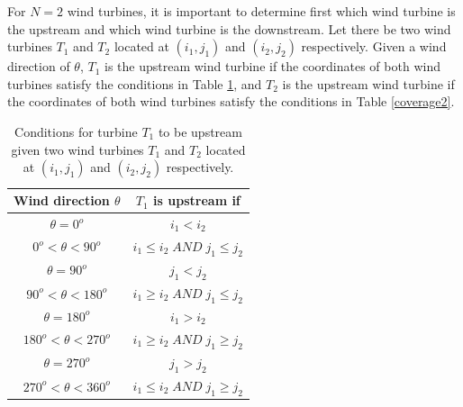     For $N=2$ wind turbines, it is important to determine first which wind turbine is the upstream and which wind turbine is the downstream. Let there be two wind turbines $T_1$ and $T_2$ located at $(i_1,j_1)$ and $(i_2,j_2)$ respectively. Given a wind direction of $\theta$, $T_1$ is the upstream wind turbine if the coordinates of both wind turbines satisfy the conditions in Table \ref{coverage1}, and $T_2$ is the upstream wind turbine if the coordinates of both wind turbines satisfy the conditions in Table \ref{coverage2}.
    
    \begin{table}[h]
        \centering
        \begin{tabular}{|c|c|} \hline
            Wind direction $\theta$ & $T_1$ is upstream if \\ \hline
            $\theta = 0^o$ & $i_1<i_2$ \\ \hline
            $0^o<\theta<90^o$ & $i_1 \leq i_2 \;AND\; j_1 \leq j_2$ \\ \hline
            $\theta = 90^o$ & $j_1<j_2$ \\ \hline
            $90^o<\theta<180^o$ & $i_1 \geq i_2 \;AND\; j_1 \leq j_2$ \\ \hline
            $\theta = 180^o$ & $i_1>i_2$ \\ \hline
            $180^o<\theta<270^o$ & $i_1 \geq i_2 \;AND\; j_1 \geq j_2$ \\ \hline
            $\theta = 270^o$ & $j_1>j_2$ \\ \hline
            $270^o<\theta<360^o$ & $i_1 \leq i_2 \;AND\; j_1 \geq j_2$ \\ \hline
        \end{tabular}
        \caption{Conditions for turbine $T_1$ to be upstream given two wind turbines $T_1$ and $T_2$ located at $(i_1,j_1)$ and $(i_2,j_2)$ respectively.}
        \label{coverage1}
    \end{table}
    

